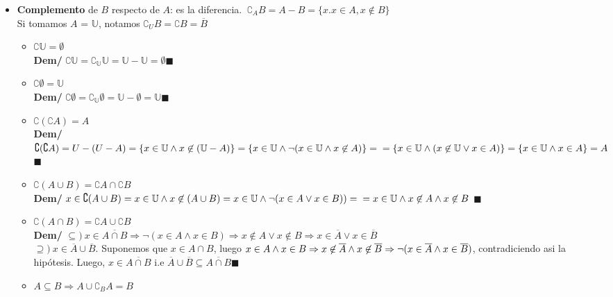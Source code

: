 \documentclass[11pt,a4paper]{article}
\newcommand*{\QEDA}{\null\nobreak\hfill\ensuremath{\blacksquare}}
\begin{document}
\begin{itemize}
\item \textbf{Complemento} de $B$ respecto de $A$: es la diferencia. $\ \complement_A B = A-B = \{x.x\in A, x\not \in B\}$\\
Si tomamos $A$ = $\mathbb{U}$, notamos $\complement_U B = \complement B = \overline{B}$
\begin{itemize}
\item $\complement \mathbb{U} = \emptyset$\\
\textbf{Dem/} $\complement\mathbb{U} = \complement_\mathbb{U} \mathbb{U} = \mathbb{U} - \mathbb{U} = \emptyset $\QEDA
\item $\complement \emptyset = \mathbb{U}$\\
\textbf{Dem/} $\complement \emptyset = \complement_\mathbb{U} \emptyset = \mathbb{U} - \emptyset = \mathbb{U} $\QEDA
\item $\complement (\complement A) = A$\\
\textbf{Dem/} $\complement (\complement A) = U - (U - A) = \{ x \in \mathbb{U} \land x \not \in (\mathbb{U} - A)\} = \{x \in \mathbb{U} \land \lnot (x \in \mathbb{U} \land x \not \in A)\} = \\ = \{x \in \mathbb{U} \land (x \not \in \mathbb{U} \lor x \in A)\} = \{ x \in \mathbb{U} \land x \in A\} = A$\QEDA
\item $\complement (A \cup B) = \complement A \cap \complement B$\\
\textbf{Dem/} $x \in \complement (A \cup B) = x \in \mathbb{U} \land x \not \in (A \cup B) = x \in \mathbb{U} \land \lnot (x \in A \lor x \in B)) = \\ = x \in \mathbb{U} \land x \not \in A \land x \not \in B$ \QEDA
\item $\complement (A \cap B) = \complement A \cup \complement B$\\
\textbf{Dem/} $\subseteq)\ x \in \overline{A \cap B} \Rightarrow \lnot(x \in A \land x \in B) \Rightarrow x \not \in A \lor x \not \in B \Rightarrow x \in \overline{A} \lor x \in \overline{B}$ \\
$\supseteq)\ x \in \overline{A} \cup \overline{B}$. Suponemos que $x \in A\cap B$, luego $x \in A \land x \in B \Rightarrow x \not \in \overline{A} \land x \not \in \overline{B} \Rightarrow \\ \lnot (x \in \overline{A} \land x \in \overline{B})$, contradiciendo asi la hip\'otesis. Luego, $x \in \overline{A \cap B}$ i.e $\overline{A} \cup \overline{B} \subseteq \overline{A \cap B}$\QEDA
\item $A \subseteq B \Rightarrow A \cup \complement_B A = B$\\

\end{itemize}
\end{itemize}
\end{document}
